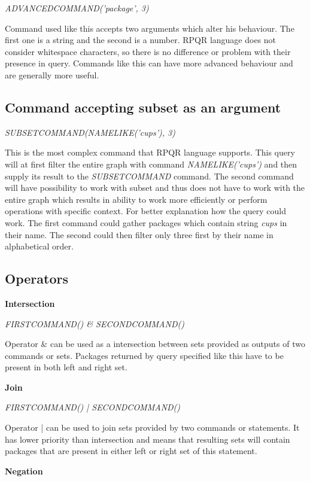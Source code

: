\textit{ADVANCEDCOMMAND('package', 3)}

Command used like this accepts two arguments which alter his behaviour. The first one is a string
and the second is a number. RPQR language does not consider whitespace characters, so there is no
difference or problem with their presence in query. Commands like this can have more advanced
behaviour and are generally more useful.

\subsection*{Command accepting subset as an argument}

\textit{SUBSETCOMMAND(NAMELIKE('cups'), 3)}

This is the most complex command that RPQR language supports. This query will at first filter the
entire graph with command \textit{NAMELIKE('cups')} and then supply its result to the \textit{SUBSETCOMMAND}
command. The second command will have possibility to work with subset and thus does not have to
work with the entire graph which results in ability to work more efficiently or perform operations
with specific context. For better explanation how the query could work. The first command could
gather packages which contain string \textit{cups} in their name. The second could then filter only
three first by their name in alphabetical order.

\newpage

\subsection*{Operators}

\textbf{Intersection}

\textit{FIRSTCOMMAND() \& SECONDCOMMAND()}

Operator \& can be used as a intersection between sets provided as outputs of two commands or sets.
Packages returned by query specified like this have to be present in both left and right set.

\textbf{Join}

\textit{FIRSTCOMMAND() | SECONDCOMMAND()}

Operator | can be used to join sets provided by two commands or statements. It has lower priority
than intersection and means that resulting sets will contain packages that are present in either
left or right set of this statement.

\textbf{Negation}

